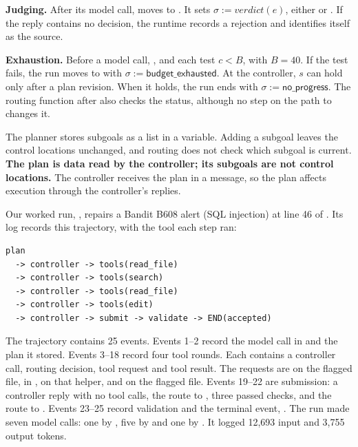 \item \textbf{Judging.} After its model call,  moves to . It sets
$\sigma := \mathit{verdict}(e)$, either  or . If the reply
contains no decision, the runtime records a rejection and identifies itself as the source.

\item \textbf{Exhaustion.} Before a model call, ,  and
 each test $c < B$, with $B = 40$. If the test fails, the run moves to
 with $\sigma := \mathsf{budget\_exhausted}$. At the controller, $s$ can hold only
after a plan revision. When it holds, the run ends with $\sigma := \mathsf{no\_progress}$.
The routing function after  also checks the status, although no step on the path
to  changes it.

\ei

The planner stores subgoals as a list in a variable. Adding a subgoal leaves the control
locations unchanged, and routing does not check which subgoal is current. \textbf{The plan is
data read by the controller; its subgoals are not control locations.} The controller receives
the plan in a message, so the plan affects execution through the controller's replies.

Our worked run, , repairs a Bandit B608 alert (SQL injection) at line 46 of
. Its log records this trajectory, with the tool each
 step ran:

\noindent\begin{minipage}{\linewidth}
\begin{lstlisting}[basicstyle=\ttfamily\scriptsize]
plan
  -> controller -> tools(read_file)
  -> controller -> tools(search)
  -> controller -> tools(read_file)
  -> controller -> tools(edit)
  -> controller -> submit -> validate -> END(accepted)
\end{lstlisting}
\end{minipage}

The trajectory contains 25 events. Events 1--2 record the model call in  and the plan
it stored. Events 3--18 record four tool rounds. Each contains a controller call, routing decision,
tool request and tool result. The requests are  on the flagged file,
 in ,  on that helper, and
 on the flagged file. Events 19--22 are submission: a controller reply with no tool
calls, the route to , three passed checks, and the route to .
Events 23--25 record validation and the terminal event, . The run made seven
model calls: one by , five by  and one by . It
logged 12,693 input and 3,755 output tokens.

